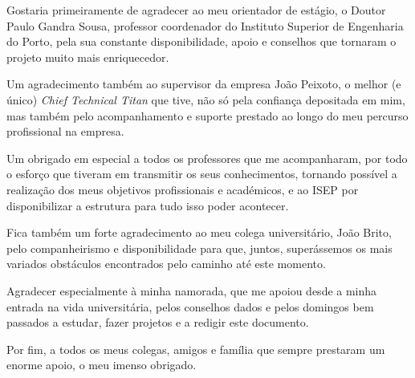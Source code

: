 
\begin{acknowledgements}

	Gostaria primeiramente de agradecer ao meu orientador de estágio, o Doutor Paulo Gandra Sousa, professor coordenador do Instituto Superior de Engenharia do Porto, pela sua constante disponibilidade, apoio e conselhos que tornaram o projeto muito mais enriquecedor.
	
	Um agradecimento também ao supervisor da empresa João Peixoto, o melhor (e único) \textit{Chief Technical Titan} que tive, não só pela confiança depositada em mim, mas também pelo acompanhamento e suporte prestado ao longo do meu percurso profissional na empresa.
	
	Um obrigado em especial a todos os professores que me acompanharam, por todo o esforço que tiveram em transmitir os seus conhecimentos, tornando possível a realização dos meus objetivos profissionais e académicos, e ao ISEP por disponibilizar a estrutura para tudo isso poder acontecer.
	
	Fica também um forte agradecimento ao meu colega universitário, João Brito, pelo companheirismo e disponibilidade para que, juntos, superássemos os mais variados obstáculos encontrados pelo caminho até este momento.
	
	Agradecer especialmente à minha namorada, que me apoiou desde a minha entrada na vida universitária, pelos conselhos dados e pelos domingos bem passados a estudar, fazer projetos e a redigir este documento.
	
	Por fim, a todos os meus colegas, amigos e família que sempre prestaram um enorme apoio, o meu imenso obrigado.

\end{acknowledgements}


\tableofcontents %

\listoffigures %

\listoftables %

\renewcommand{\lstlistlistingname}{List of Source Code}
\iflanguage{portuguese}{
\renewcommand{\lstlistlistingname}{Lista de C\'odigo}
}

